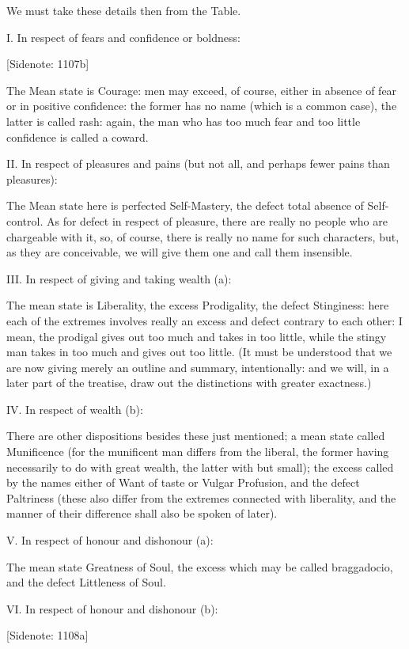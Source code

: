 We must take these details then from the Table.

I. In respect of fears and confidence or boldness:

[Sidenote: 1107b]

The Mean state is Courage: men may exceed, of course, either in absence
of fear or in positive confidence: the former has no name (which is a
common case), the latter is called rash: again, the man who has too much
fear and too little confidence is called a coward.

II. In respect of pleasures and pains (but not all, and perhaps fewer
pains than pleasures):

The Mean state here is perfected Self-Mastery, the defect total absence
of Self-control. As for defect in respect of pleasure, there are really
no people who are chargeable with it, so, of course, there is really no
name for such characters, but, as they are conceivable, we will give
them one and call them insensible.

III. In respect of giving and taking wealth (a):

The mean state is Liberality, the excess Prodigality, the defect
Stinginess: here each of the extremes involves really an excess and
defect contrary to each other: I mean, the prodigal gives out too much
and takes in too little, while the stingy man takes in too much and
gives out too little. (It must be understood that we are now giving
merely an outline and summary, intentionally: and we will, in a later
part of the treatise, draw out the distinctions with greater exactness.)

IV. In respect of wealth (b):

There are other dispositions besides these just mentioned; a mean state
called Munificence (for the munificent man differs from the liberal, the
former having necessarily to do with great wealth, the latter with but
small); the excess called by the names either of Want of taste or
Vulgar Profusion, and the defect Paltriness (these also differ from the
extremes connected with liberality, and the manner of their difference
shall also be spoken of later).

V. In respect of honour and dishonour (a):

The mean state Greatness of Soul, the excess which may be called
braggadocio, and the defect Littleness of Soul.

VI. In respect of honour and dishonour (b):

[Sidenote: 1108a]

